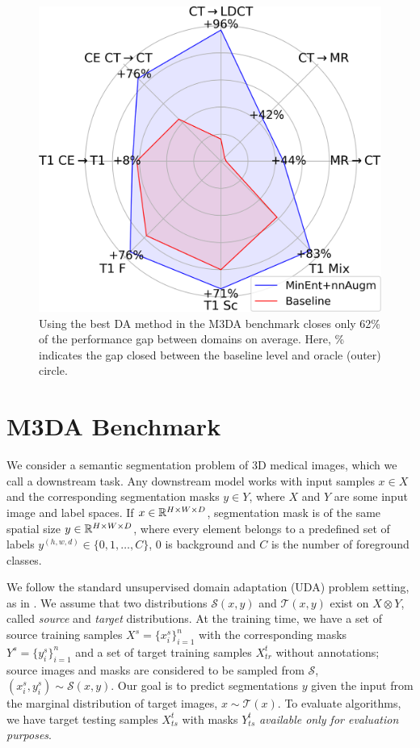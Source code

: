 \begin{figure}[h]
	\centering
	\includegraphics[width=\linewidth]{Dissertation/Figures/4_da_bench/fig1_teaser.png}
	\caption{Using the best DA method in the M3DA benchmark closes only 62\% of the performance gap between domains on average. Here, \% indicates the gap closed between the baseline level and oracle (outer) circle.}
	\label{fig:teaser1}
\end{figure}


\section{M3DA Benchmark}

We consider a semantic segmentation problem of 3D medical images, which we call a downstream task. Any downstream model works with input samples $x \in X$ and the corresponding segmentation masks $y \in Y$, where $X$ and $Y$ are some input image and label spaces. If $x \in \mathbb{R}^{H \times W \times D}$, segmentation mask is of the same spatial size $y \in \mathbb{R}^{H \times W \times D}$, where every element belongs to a predefined set of labels $y^{(h,w,d)} \in \{ 0, 1, \dots, C \}$, $0$ is background and $C$ is the number of foreground classes.

We follow the standard unsupervised domain adaptation (UDA) problem setting, as in \cite{dann}. We assume that two distributions $\mathcal{S}(x, y)$ and $\mathcal{T}(x, y)$ exist on $X \otimes Y$, called \textit{source} and \textit{target} distributions. At the training time, we have a set of source training samples $X^s = \{ x_i^s \}_{i=1}^n$ with the corresponding masks $Y^s = \{ y_i^s \}_{i=1}^n$ and a set of target training samples $X^t_{tr}$ without annotations; source images and masks are considered to be sampled from $\mathcal{S}$, $(x_i^s, y_i^s) \sim \mathcal{S}(x, y)$. Our goal is to predict segmentations $y$ given the input from the marginal distribution of target images, $x \sim \mathcal{T}(x)$. To evaluate algorithms, we have target testing samples $X^t_{ts}$ with masks $Y^t_{ts}$ \textit{available only for evaluation purposes}.

